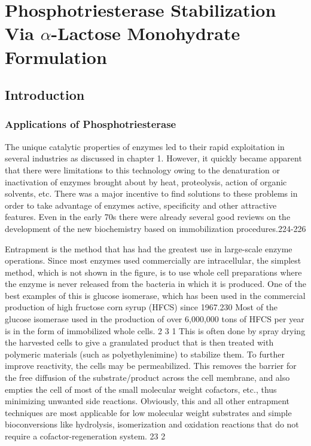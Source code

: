 \chapter{Phosphotriesterase Stabilization Via $\alpha$-Lactose Monohydrate Formulation} 
\label{chap:lactose}

\begin{refsection}

\section{Introduction}

\subsection{Applications of Phosphotriesterase}

The unique catalytic properties of enzymes led to their rapid exploitation in
several industries as discussed in chapter 1. However, it quickly became
apparent that there were limitations to this technology owing to the
denaturation or inactivation of enzymes brought about by heat, proteolysis,
action of organic solvents, etc.  There was a major incentive to find solutions
to these problems in order to take advantage of enzymes active, specificity and
other attractive features.  Even in the early 70s there were already several
good reviews on the development of the new biochemistry based on immobilization
procedures.224-226

Entrapment is the method that has had the greatest use in large-scale enzyme
operations. Since most enzymes used commercially are intracellular, the
simplest method, which is not shown in the figure, is to use whole cell
preparations where the enzyme is never released from the bacteria in which it
is produced. One of the best examples of this is glucose isomerase, which has
been used in the commercial production of high fructose corn syrup (HFCS) since
1967.230 Most of the glucose isomerase used in the production of over 6,000,000
tons of HFCS per year is in the form of immobilized whole cells. 2 3 1 This is
often done by spray drying the harvested cells to give a granulated product
that is then treated with polymeric materials (such as polyethylenimine) to
stabilize them. To further improve reactivity, the cells may be permeabilized.
This removes the barrier for the free diffusion of the substrate/product across
the cell membrane, and also empties the cell of most of the small molecular
weight cofactors, etc., thus minimizing unwanted side reactions. Obviously,
this and all other entrapment techniques are most applicable for low molecular
weight substrates and simple bioconversions like hydrolysis, isomerization and
oxidation reactions that do not require a cofactor-regeneration system. 23 2


\end{refsection}
